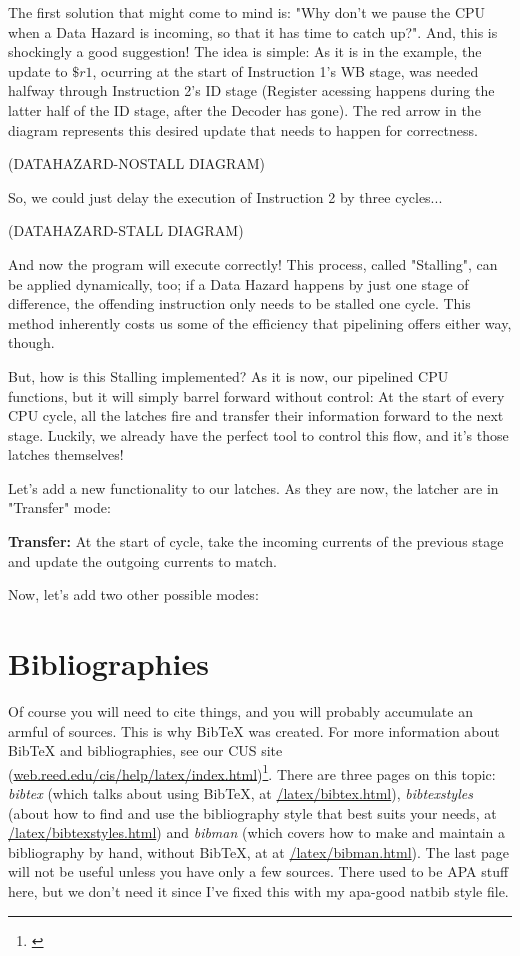 \documentclass[12pt,twoside]{reedthesis}
\begin{document}
The first solution that might come to mind is: "Why don't we pause the CPU when a Data Hazard is incoming, so that it has time to catch up?". And, this is shockingly a good suggestion! The idea is simple: As it is in the example, the update to $\$r1$, ocurring at the start of Instruction 1's WB stage, was needed halfway through Instruction 2's ID stage (Register acessing happens during the latter half of the ID stage, after the Decoder has gone). The red arrow in the diagram represents this desired update that needs to happen for correctness.

(DATAHAZARD-NOSTALL DIAGRAM)

So, we could just delay the execution of Instruction 2 by three cycles...

(DATAHAZARD-STALL DIAGRAM)

And now the program will execute correctly! This process, called "Stalling", can be applied dynamically, too; if a Data Hazard happens by just one stage of difference, the offending instruction only needs to be stalled one cycle. This method inherently costs us some of the efficiency that pipelining offers either way, though.

But, how is this Stalling implemented? As it is now, our pipelined CPU functions, but it will simply barrel forward without control: At the start of every CPU cycle, all the latches fire and transfer their information forward to the next stage. Luckily, we already have the perfect tool to control this flow, and it's those latches themselves!

Let's add a new functionality to our latches. As they are now, the latcher are in "Transfer" mode:

\qquad \textbf{Transfer:} At the start of cycle, take the incoming currents of the previous stage and update the outgoing currents to match.

Now, let's add two other possible modes:


\section{Bibliographies}
Of course you will need to cite things, and you will probably accumulate an armful of sources. This is why BibTeX was created. For more information about BibTeX and bibliographies, see our CUS site (\url{web.reed.edu/cis/help/latex/index.html})\footnote{\cite{reedweb:2007}}. There are three pages on this topic: {\it bibtex} (which talks about using BibTeX, at \url{/latex/bibtex.html}), {\it bibtexstyles} (about how to find and use the bibliography style that best suits your needs, at \url{/latex/bibtexstyles.html}) and {\it bibman} (which covers how to make and maintain a bibliography by hand, without BibTeX, at at \url{/latex/bibman.html}). The last page will not be useful unless you have only a few sources. There used to be APA stuff here, but we don't need it since I've fixed this with my apa-good natbib style file.
\end{document}
